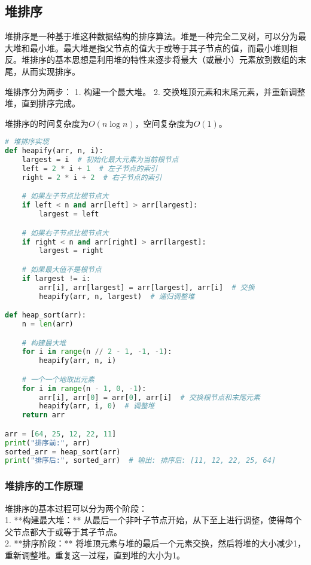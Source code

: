 \documentclass{article}
\begin{document}
\subsection{堆排序}
堆排序是一种基于堆这种数据结构的排序算法。堆是一种完全二叉树，可以分为最大堆和最小堆。最大堆是指父节点的值大于或等于其子节点的值，而最小堆则相反。堆排序的基本思想是利用堆的特性来逐步将最大（或最小）元素放到数组的末尾，从而实现排序。

堆排序分为两步：
1. 构建一个最大堆。
2. 交换堆顶元素和末尾元素，并重新调整堆，直到排序完成。

堆排序的时间复杂度为$O(n \log n)$，空间复杂度为$O(1)$。

\begin{lstlisting}[language=Python,caption=堆排序实现]
# 堆排序实现
def heapify(arr, n, i):
    largest = i  # 初始化最大元素为当前根节点
    left = 2 * i + 1  # 左子节点的索引
    right = 2 * i + 2  # 右子节点的索引

    # 如果左子节点比根节点大
    if left < n and arr[left] > arr[largest]:
        largest = left

    # 如果右子节点比根节点大
    if right < n and arr[right] > arr[largest]:
        largest = right

    # 如果最大值不是根节点
    if largest != i:
        arr[i], arr[largest] = arr[largest], arr[i]  # 交换
        heapify(arr, n, largest)  # 递归调整堆

def heap_sort(arr):
    n = len(arr)

    # 构建最大堆
    for i in range(n // 2 - 1, -1, -1):
        heapify(arr, n, i)

    # 一个一个地取出元素
    for i in range(n - 1, 0, -1):
        arr[i], arr[0] = arr[0], arr[i]  # 交换根节点和末尾元素
        heapify(arr, i, 0)  # 调整堆
    return arr

arr = [64, 25, 12, 22, 11]
print("排序前:", arr)
sorted_arr = heap_sort(arr)
print("排序后:", sorted_arr)  # 输出: 排序后: [11, 12, 22, 25, 64]
\end{lstlisting}

\subsubsection{堆排序的工作原理}
堆排序的基本过程可以分为两个阶段：\\
1. **构建最大堆：** 从最后一个非叶子节点开始，从下至上进行调整，使得每个父节点都大于或等于其子节点。\\
2. **排序阶段：** 将堆顶元素与堆的最后一个元素交换，然后将堆的大小减少1，重新调整堆。重复这一过程，直到堆的大小为1。
\end{document}
